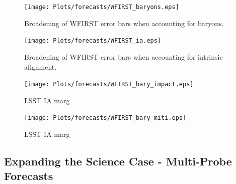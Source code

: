 \begin{figure}
\texttt{[image: Plots/forecasts/WFIRST\_baryons.eps]}
\caption{Broadening of WFIRST error bars when accounting for baryons.}
         \label{fi:lsst1}
\end{figure}

\begin{figure}
\texttt{[image: Plots/forecasts/WFIRST\_ia.eps]}
\caption{Broadening of WFIRST error bars when accounting for intrinsic alignment.}
         \label{fi:lsst1}
\end{figure}



\begin{figure}
\texttt{[image: Plots/forecasts/WFIRST\_bary\_impact.eps]}
\caption{LSST IA marg}
         \label{fi:lsst1}
\end{figure}

\begin{figure}
\texttt{[image: Plots/forecasts/WFIRST\_bary\_miti.eps]}
\caption{LSST IA marg}
         \label{fi:lsst1}
\end{figure}


\subsection{Expanding the Science Case - Multi-Probe Forecasts}
\label{sec:multi-probe}

